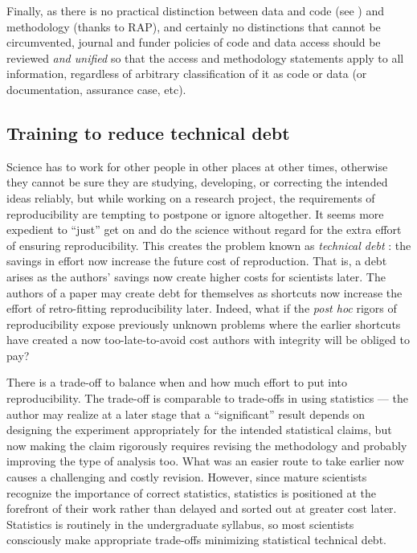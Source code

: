 \documentclass{comjnl}
\begin{document}
Finally, as there is no practical distinction between data and code (see \supplement) and methodology (thanks to RAP), and certainly no distinctions that cannot be circumvented, journal and funder policies of code and data access should be reviewed \emph{and unified\/} so that the access and methodology statements apply to all information, regardless of arbitrary classification of it as code or data (or documentation, assurance case, etc).

\subsection{Training to reduce technical debt}\label{technical-debt}
Science has to work for other people in other places at other times, otherwise they cannot be sure they are studying, developing, or correcting the intended ideas reliably, but while working on a research project, the requirements of reproducibility are tempting to postpone or ignore altogether. It seems more expedient to ``just'' get on and do the science without regard for the extra effort of ensuring reproducibility. This creates the problem known as \emph{technical debt} \cite{debt}: the savings in effort now increase the future cost of reproduction. That is, a debt arises as the authors' savings now create higher costs for scientists later. The authors of a paper may create debt for themselves as shortcuts now increase the effort of retro-fitting reproducibility later. Indeed, what if the \emph{post hoc\/} rigors of reproducibility expose previously unknown problems where the earlier shortcuts have created a now too-late-to-avoid cost authors with integrity will be obliged to pay?

There is a trade-off to balance when and how much effort to put into reproducibility. The trade-off is comparable to trade-offs in using statistics --- the author may realize at a later stage that a ``significant'' result depends on designing the experiment appropriately for the intended statistical claims, but now making the claim rigorously requires revising the methodology and probably improving the type of analysis too. What was an easier route to take earlier now causes a challenging and costly revision. However, since mature scientists recognize the importance of correct statistics, statistics is positioned at the forefront of their work rather than delayed and sorted out at greater cost later. Statistics is routinely in the undergraduate syllabus, so most scientists consciously make appropriate trade-offs minimizing statistical technical debt.
 
\end{document}
